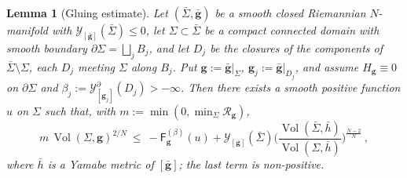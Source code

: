 \documentclass[aps,prd,reprint,amsmath,amssymb,nofootinbib,longbibliography]{revtex4-2}
\DeclareMathOperator{\Vol}{Vol}
\newcommand{\g}{\mathbf{g}}                 %
\newcommand{\gbar}{\bar{\mathbf{g}}}        %
\newcommand{\Rs}{\mathcal{R}}               %
\newcommand{\Sigbar}{\bar{\Sigma}}          %
\newcommand{\Y}{\mathcal{Y}}                %
\newcommand{\YB}{\mathcal{Y}^{\partial}}    %
\newcommand{\Fq}{\mathsf{F}}                %
\theoremstyle{plain}
\newtheorem{lemma}[theorem]{Lemma}
\theoremstyle{definition}
\theoremstyle{remark}
\begin{document}
\begin{lemma}[Gluing estimate]
\label{lem:gluing-estimate}
Let $(\Sigbar,\gbar)$ be a smooth closed Riemannian $N$-manifold with $\Y_{[\gbar]}(\Sigbar)\le0$, let $\Sigma\subset\Sigbar$ be a compact connected domain with smooth boundary $\partial\Sigma=\bigsqcup_jB_j$, and let $D_j$ be the closures of the components of $\Sigbar\setminus\Sigma$, each $D_j$ meeting $\Sigma$ along $B_j$. Put $\g:=\gbar|_\Sigma$, $\g_j:=\gbar|_{D_j}$, and assume $H_\g\equiv0$ on $\partial\Sigma$ and $\beta_j:=\YB_{[\g_j]}(D_j)>-\infty$. Then there exists a smooth positive function $u$ on $\Sigma$ such that, with $m:=\min(0,\min_\Sigma\Rs_\g)$,
\begin{equation}
\label{eq:gluing-estimate}
m\,\Vol(\Sigma,\g)^{2/N}\ \le\ -\Fq^{(\beta)}_\g(u)+\Y_{[\gbar]}(\Sigbar)\Big(\frac{\Vol(\Sigbar,\bar h)}{\Vol(\Sigma,\bar h)}\Big)^{\frac{N-2}{N}}\ ,
\end{equation}
where $\bar h$ is a Yamabe metric of $[\gbar]$; the last term is non-positive.
\end{lemma}
\end{document}
